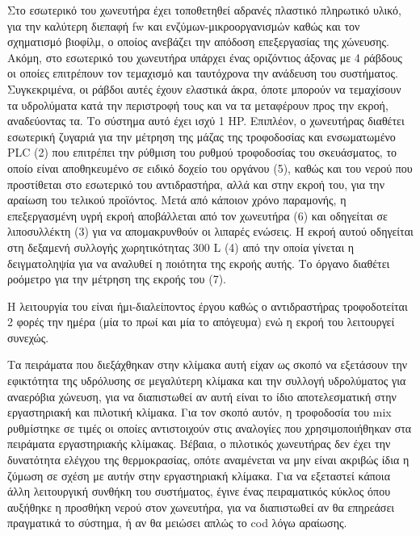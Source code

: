\documentclass[11pt]{report}
\begin{document}
Στο εσωτερικό του χωνευτήρα έχει τοποθετηθεί αδρανές πλαστικό πληρωτικό υλικό, για την καλύτερη διεπαφή \acrshort{fw} και ενζύμων-μικροοργανισμών καθώς και τον σχηματισμό βιοφίλμ, ο οποίος ανεβάζει την απόδοση επεξεργασίας της χώνευσης. Ακόμη, στο εσωτερικό του χωνευτήρα υπάρχει ένας οριζόντιος άξονας με 4 ράβδους οι οποίες επιτρέπουν τον τεμαχισμό και ταυτόχρονα την ανάδευση του συστήματος. Συγκεκριμένα, οι ράβδοι αυτές έχουν ελαστικά άκρα, όποτε μπορούν να τεμαχίσουν τα υδρολύματα κατά την περιστροφή τους και να τα μεταφέρουν προς την εκροή, αναδεύοντας τα. Το σύστημα αυτό έχει ισχύ 1 HP. Επιπλέον, ο χωνευτήρας διαθέτει εσωτερική ζυγαριά για την μέτρηση της μάζας της τροφοδοσίας και ενσωματωμένο PLC (2) που επιτρέπει την ρύθμιση του ρυθμού τροφοδοσίας του σκευάσματος, το οποίο είναι αποθηκευμένο σε ειδικό δοχείο του οργάνου (5), καθώς και του νερού που προστίθεται στο εσωτερικό του αντιδραστήρα, αλλά και στην εκροή του, για την αραίωση του τελικού προϊόντος. Μετά από κάποιον χρόνο παραμονής, η επεξεργασμένη υγρή εκροή αποβάλλεται από τον χωνευτήρα (6) και οδηγείται σε λιποσυλλέκτη (3) για να απομακρυνθούν οι λιπαρές ενώσεις. Η εκροή αυτού οδηγείται στη δεξαμενή συλλογής χωρητικότητας 300 L (4) από την οποία γίνεται η δειγματοληψία για να αναλυθεί η ποιότητα της εκροής αυτής. Το όργανο διαθέτει ροόμετρο για την μέτρηση της εκροής του (7).

Η λειτουργία του είναι ήμι-διαλείποντος έργου καθώς ο αντιδραστήρας τροφοδοτείται 2 φορές την ημέρα (μία το πρωί και μία το απόγευμα) ενώ η εκροή του λειτουργεί συνεχώς.

Τα πειράματα που διεξάχθηκαν στην κλίμακα αυτή είχαν ως σκοπό να εξετάσουν την εφικτότητα της υδρόλυσης σε μεγαλύτερη κλίμακα και την συλλογή υδρολύματος για αναερόβια χώνευση, για να διαπιστωθεί αν αυτή είναι το ίδιο αποτελεσματική στην εργαστηριακή και πιλοτική κλίμακα. Για τον σκοπό αυτόν, η τροφοδοσία του \acrshort{mix} ρυθμίστηκε σε τιμές οι οποίες αντιστοιχούν στις αναλογίες που χρησιμοποιήθηκαν στα πειράματα εργαστηριακής κλίμακας. Βέβαια, ο πιλοτικός χωνευτήρας δεν έχει την δυνατότητα ελέγχου της θερμοκρασίας, οπότε αναμένεται να μην είναι ακριβώς ίδια η ζύμωση σε σχέση με αυτήν στην εργαστηριακή κλίμακα. Για να εξεταστεί κάποια άλλη λειτουργική συνθήκη του συστήματος, έγινε ένας πειραματικός κύκλος όπου αυξήθηκε η προσθήκη νερού στον χωνευτήρα, για να διαπιστωθεί αν θα επηρεάσει πραγματικά το σύστημα, ή αν θα μειώσει απλώς το \acrshort{cod} λόγω αραίωσης.
\end{document}

